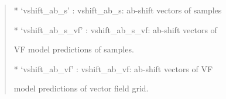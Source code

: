 \documentclass[letterpaper,10pt,english]{sphinxmanual}
\begin{document}
\begin{fulllineitems}
\begin{description}
\begin{quote}
\begin{description}
\begin{DUlineblock}{0em}
\begin{DUlineblock}{\DUlineblockindent}
\begin{DUlineblock}{\DUlineblockindent}
\item[] * ‘vshift\_ab\_s’ : vshift\_ab\_s: ab-shift vectors of samples 
\item[] * ‘vshift\_ab\_s\_vf’ : vshift\_ab\_s\_vf: ab-shift vectors of 
\item[]
\begin{DUlineblock}{\DUlineblockindent}
\item[] VF model predictions of samples.
\end{DUlineblock}
\item[] * ‘vshift\_ab\_vf’ : vshift\_ab\_vf: ab-shift vectors of VF 
\item[]
\begin{DUlineblock}{\DUlineblockindent}
\item[] model predictions of vector field grid.
\end{DUlineblock}
\end{DUlineblock}
\end{DUlineblock}
\end{DUlineblock}

\end{description}\end{quote}

\end{description}

\end{fulllineitems}

\end{document}
